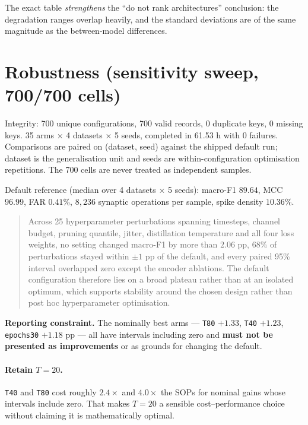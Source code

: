 \noindent The exact table \emph{strengthens} the ``do not rank architectures''
conclusion: the degradation ranges overlap heavily, and the standard deviations are of the
same magnitude as the between-model differences.

\section*{Robustness (sensitivity sweep, 700/700 cells)}

Integrity: 700 unique configurations, 700 valid records, 0 duplicate keys, 0 missing
keys. 35 arms $\times$ 4 datasets $\times$ 5 seeds, completed in 61.53 h with 0
failures. Comparisons are paired on (dataset, seed) against the shipped default run;
dataset is the generalisation unit and seeds are within-configuration optimisation
repetitions. The 700 cells are never treated as independent samples.

Default reference (median over 4 datasets $\times$ 5 seeds): macro-F1 $89.64$,
MCC $96.99$, FAR $0.41\%$, $8{,}236$ synaptic operations per sample, spike
density $10.36\%$.

\begin{quote}
Across 25 hyperparameter perturbations spanning timesteps, channel budget, pruning
quantile, jitter, distillation temperature and all four loss weights, no setting
changed macro-F1 by more than $2.06$ pp, $68\%$ of perturbations stayed within
$\pm1$ pp of the default, and every paired 95\% interval overlapped zero except the
encoder ablations. The default configuration therefore lies on a broad plateau rather
than at an isolated optimum, which supports stability around the chosen design rather
than post hoc hyperparameter optimisation.
\end{quote}

\noindent\textbf{Reporting constraint.} The nominally best arms --- \texttt{T80}
$+1.33$, \texttt{T40} $+1.23$, \texttt{epochs30} $+1.18$ pp --- all have intervals
including zero and \textbf{must not be presented as improvements} or as grounds for
changing the default.

\paragraph{Retain $T=20$.} \texttt{T40} and \texttt{T80} cost roughly $2.4\times$ and
$4.0\times$ the SOPs for nominal gains whose intervals include zero. That makes
$T=20$ a sensible cost--performance choice without claiming it is mathematically
optimal.

